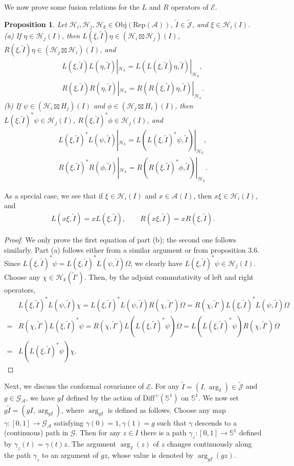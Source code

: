 \documentclass[12pt,a4paper]{article}
\theoremstyle{definition}
\theoremstyle{plain}
\newtheorem{pp}[df]{Proposition}
\newcommand{\mc}{\mathcal}
\newcommand{\wtd}{\widetilde}
\newcommand{\Diffp}{\mathrm{Diff}^+}
\newcommand{\GA}{\mathscr G_{\mathcal A}}
\newcommand{\scr}{\mathscr}
\newcommand{\Jtd}{\widetilde{\mathcal J}}
\newcommand{\RepA}{\mathrm{Rep}(\mc A)}
\newcommand{\mbb}{\mathbb}
\newcommand{\Obj}{\mathrm{Obj}}
\numberwithin{equation}{section}
\begin{document}
We now prove some fusion relations for the $L$ and $R$ operators of $\scr E$.
\begin{pp}\label{lb5}
Let $\mc H_i,\mc H_j,\mc H_k\in\Obj(\RepA)$, $\wtd I\in\Jtd$, and $\xi\in\mc H_i(I)$.\\
(a) If $\eta\in\mc H_j(I)$, then $L(\xi,\wtd I)\eta\in(\mc H_i\boxtimes\mc H_j)(I)$, $R(\xi,\wtd I)\eta\in(\mc H_j\boxtimes\mc H_i)(I)$, and
\begin{gather}
L(\xi,\wtd I)L(\eta,\wtd I)|_{\mc H_k}=L(L(\xi,\wtd I)\eta,\wtd I)|_{\mc H_k},\\
R(\xi,\wtd I)R(\eta,\wtd I)|_{\mc H_k}=R(R(\xi,\wtd I)\eta,\wtd I)|_{\mc H_k}.
\end{gather}
(b) If $\psi\in(\mc H_i\boxtimes H_j)(I)$ and $\phi\in (\mc H_j\boxtimes H_i)(I)$, then $L(\xi,\wtd I)^*\psi\in\mc H_j(I)$, $R(\xi,\wtd I)^*\phi\in\mc H_j(I)$, and
\begin{gather}
L(\xi,\wtd I)^*L(\psi,\wtd I)|_{\mc H_k}=L(L(\xi,\wtd I)^*\psi,\wtd I)|_{\mc H_k},\\
 R(\xi,\wtd I)^*R(\phi,\wtd I)|_{\mc H_k}=R(R(\xi,\wtd I)^*\phi,\wtd I)|_{\mc H_k}.
\end{gather}
\end{pp}
As a special case, we see that if $\xi\in\mc H_i(I)$ and $x\in\mc A(I)$, then $x\xi\in\mc H_i(I)$, and
\begin{gather}
L(x\xi,\wtd I)=xL(\xi,\wtd I),\qquad R(x\xi,\wtd I)=xR(\xi,\wtd I).\label{eq47}
\end{gather}
\begin{proof}
We only prove the first equation of part (b); the second one follows similarly. Part (a) follows either from a similar argument or from \cite{Gui21a} proposition 3.6. Since $L(\xi,\wtd I)^*\psi=L(\xi,\wtd I)^*L(\psi,\wtd I)\Omega$, we clearly have $L(\xi,\wtd I)^*\psi\in\mc H_j(I)$. Choose any $\chi\in\mc H_k(\wtd I')$. Then, by the adjoint commutativity of left and right operators,
\begin{align*}
&L(\xi,\wtd I)^*L(\psi,\wtd I)\chi=L(\xi,\wtd I)^*L(\psi,\wtd I)R(\chi,\wtd I')\Omega=R(\chi,\wtd I')L(\xi,\wtd I)^*L(\psi,\wtd I)\Omega\\
=&R(\chi,\wtd I')L(\xi,\wtd I)^*\psi=R(\chi,\wtd I')L(L(\xi,\wtd I)^*\psi)\Omega=L(L(\xi,\wtd I)^*\psi)R(\chi,\wtd I')\Omega\\
=&L(L(\xi,\wtd I)^*\psi)\chi.
\end{align*}
\end{proof}

Next, we discuss the conformal covariance of $\scr E$. For any $\wtd I=(I,\arg_I)\in\Jtd$ and $g\in\GA$, we have $gI$ defined by the action of $\Diffp(\mbb S^1)$ on $\mbb S^1$. We now set $g\wtd I=(gI,\arg_{gI})$, where $\arg_{gI}$ is defined as follows. Choose any map $\gamma:[0,1]\rightarrow\GA$ satisfying $\gamma(0)=1,\gamma(1)=g$ such that $\gamma$ descends to a (continuous) path in $\scr G$. Then for any $z\in I$ there is a path $\gamma_z:[0,1]\rightarrow \mbb S^1$ defined by $\gamma_z(t)=\gamma(t)z$. The argument $\arg_I(z)$ of $z$ changes continuously along the path $\gamma_z$ to an argument of $gz$, whose value is denoted by $\arg_{gI}(gz)$. 
\end{document}
